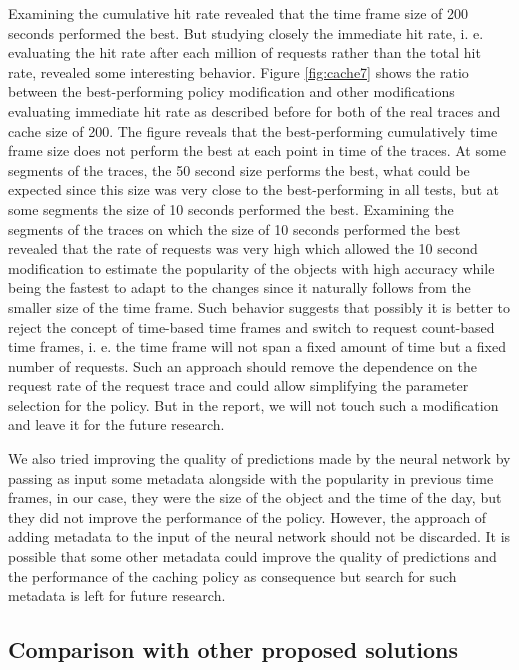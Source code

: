 Examining the cumulative hit rate revealed that the time frame size of 200 seconds performed the best. But studying closely the immediate hit rate, i. e. evaluating the hit rate after each million of requests rather than the total hit rate, revealed some interesting behavior. Figure \ref{fig:cache7} shows the ratio between the best-performing policy modification and other modifications evaluating immediate hit rate as described before for both of the real traces and cache size of 200. The figure reveals that the best-performing cumulatively time frame size does not perform the best at each point in time of the traces. At some segments of the traces, the 50 second size performs the best, what could be expected since this size was very close to the best-performing in all tests, but at some segments the size of 10 seconds performed the best. Examining the segments of the traces on which the size of 10 seconds performed the best revealed that the rate of requests was very high which allowed the 10 second modification to estimate the popularity of the objects with high accuracy while being the fastest to adapt to the changes since it naturally follows from the smaller size of the time frame. Such behavior suggests that possibly it is better to reject the concept of time-based time frames and switch to request count-based time frames, i. e. the time frame will not span a fixed amount of time but a fixed number of requests. Such an approach should remove the dependence on the request rate of the request trace and could allow simplifying the parameter selection for the policy. But in the report, we will not touch such a modification and leave it for the future research.

We also tried improving the quality of predictions made by the neural network by passing as input some metadata alongside with the popularity in previous time frames, in our case, they were the size of the object and the time of the day, but they did not improve the performance of the policy. However, the approach of adding metadata to the input of the neural network should not be discarded. It is possible that some other metadata could improve the quality of predictions and the performance of the caching policy as consequence but search for such metadata is left for future research.

\subsection{Comparison with other proposed solutions} \label{comparison}


